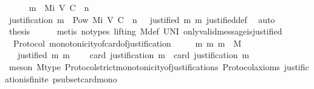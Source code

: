 \begin{isabellebody}
\ \ \ \ \isamarkupfalse%
\ {\isachardoublequoteopen}m{\isacharprime}\ {\isasymin}\ M{\isacharunderscore}i\ {\isacharparenleft}V{\isacharcomma}\ C{\isacharcomma}\ {\isasymepsilon}{\isacharparenright}\ {\isacharparenleft}n\ {\isacharminus}\ {}{\isacharparenright}{\isachardoublequoteclose}\isanewline
\ \ \ \ \ \ \isamarkupfalse%
\ {\isacartoucheopen}justification\ m\ {\isasymin}\ Pow\ {\isacharparenleft}M{\isacharunderscore}i\ {\isacharparenleft}V{\isacharcomma}\ C{\isacharcomma}\ {\isasymepsilon}{\isacharparenright}\ {\isacharparenleft}n\ {\isacharminus}\ {}{\isacharparenright}{\isacharparenright}{\isacartoucheclose}\ {\isacartoucheopen}justified\ m{\isacharprime}\ m{\isacartoucheclose}\ justified{\isacharunderscore}def\ \isamarkupfalse%
\ auto\isanewline
\ \ \isamarkupfalse%
\isanewline
\ \ \isamarkupfalse%
\ \isamarkupfalse%
\ {\isacharquery}thesis\isanewline
\ \ \ \ \isamarkupfalse%
\ {\isacharparenleft}metis\ {\isacharparenleft}no{\isacharunderscore}types{\isacharcomma}\ lifting{\isacharparenright}\ M{\isacharunderscore}def\ UN{\isacharunderscore}I\ only{\isacharunderscore}valid{\isacharunderscore}message{\isacharunderscore}is{\isacharunderscore}justified{\isacharparenright}\isanewline
{}\isamarkupfalse%
%
\endisatagproof
{\isafoldproof}%
%
\isadelimproof
\ \ \isanewline
%
\endisadelimproof
\isanewline
{}\isamarkupfalse%
\ {\isacharparenleft}\ Protocol{\isacharparenright}\ monotonicity{\isacharunderscore}of{\isacharunderscore}card{\isacharunderscore}of{\isacharunderscore}justification\ {\isacharcolon}\ \isanewline
\ \ {\isachardoublequoteopen}{\isasymforall}\ m\ m{\isacharprime}{\isachardot}\ m\ {\isasymin}\ M\ \isanewline
\ \ {\isasymlongrightarrow}\ justified\ m{\isacharprime}\ m\ \isanewline
\ \ {\isasymlongrightarrow}\ card\ {\isacharparenleft}justification\ m{\isacharprime}{\isacharparenright}\ {\isacharless}\ card\ {\isacharparenleft}justification\ m{\isacharparenright}{\isachardoublequoteclose}\isanewline
%
\isadelimproof
\ \ %
\endisadelimproof
%
\isatagproof
{}\isamarkupfalse%
\ {\isacharparenleft}meson\ M{\isacharunderscore}type\ Protocol{\isachardot}strict{\isacharunderscore}monotonicity{\isacharunderscore}of{\isacharunderscore}justifications\ Protocol{\isacharunderscore}axioms\ justification{\isacharunderscore}is{\isacharunderscore}finite\ psubset{\isacharunderscore}card{\isacharunderscore}mono{\isacharparenright}%
\endisatagproof
{\isafoldproof}%

\end{isabellebody}

